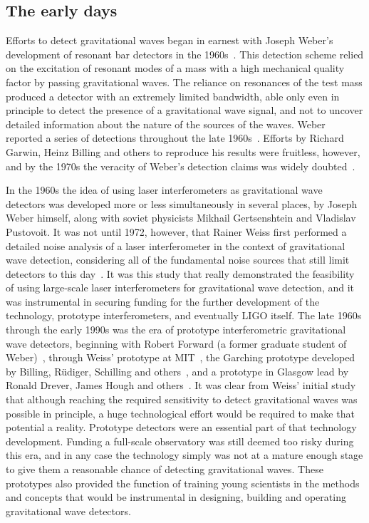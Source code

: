\subsection{The early days}
Efforts to detect gravitational waves began in earnest with Joseph Weber's development of resonant bar detectors 
in the 1960s~\cite{Weber_1968}. This detection scheme relied on the excitation of resonant modes of a mass with a high mechanical 
quality factor by passing gravitational waves. The reliance on resonances of the test mass produced a detector 
with an extremely limited bandwidth, able only even in principle to detect the presence of a gravitational wave signal, and not 
to uncover detailed information about the nature of the sources of the waves. 
Weber reported a series of detections throughout the late 1960s~\cite{Weber_1969}. Efforts by Richard Garwin, Heinz Billing and others 
to reproduce his results were fruitless, however, and by the 1970s the veracity of Weber's detection claims was widely doubted~\cite{Garwin_1973, Kafka_1978}. 

In the 1960s the idea of using laser interferometers as gravitational wave detectors was developed more or less simultaneously 
in several places, by Joseph Weber himself, along with soviet physicists Mikhail Gertsenshtein and Vladislav Pustovoit. 
It was not until 1972, however, that Rainer Weiss first performed a detailed noise analysis of a laser interferometer in the context 
of gravitational wave detection, considering all of the fundamental noise sources that still limit detectors to this day~\cite{Weiss1972}. 
It was this study that really demonstrated the feasibility of using large-scale laser interferometers for gravitational wave detection, and it was instrumental in securing funding for the further development of the technology, prototype interferometers, and eventually LIGO itself. 
The late 1960s through the early 1990s was the era of prototype interferometric gravitational wave detectors, beginning with 
Robert Forward (a former graduate student of Weber)~\cite{Forward_1978}, through Weiss' prototype at MIT~\cite{Dewey_1984}, the Garching prototype developed by Billing, R\"{u}diger, Schilling and others~\cite{Shoemaker1988}, and a prototype in Glasgow lead by Ronald Drever, James Hough and others~\cite{Robertson_1995}. 
It was clear from Weiss' initial study that although reaching the required sensitivity to detect gravitational waves 
was possible in principle, a huge technological effort would 
be required to make that potential a reality. 
Prototype detectors were an essential part of that technology development. Funding a full-scale 
observatory was still deemed too risky during this era, and in any case the technology simply was not at a mature enough stage to give them 
a reasonable chance of detecting gravitational waves. These prototypes also provided the function 
of training young scientists in the methods and concepts that would be instrumental in 
designing, building and operating gravitational wave detectors. 

